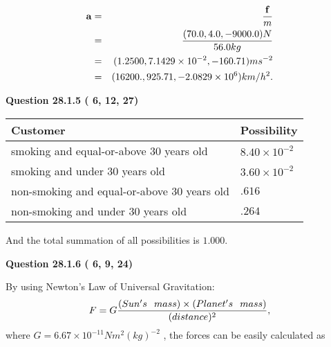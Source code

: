 \documentclass[12pt]{article}
\begin{document}
\begin{eqnarray*}
\mathbf{a}&=&\frac{\mathbf{f}}m  \\
&=&\frac{(
70.0 ,
4.0 ,
-9000.0 )N
}{ %
56.0 kg}  \\
&=&(
1.2500 ,
7.1429 \times 10^{-2},
-160.71
)ms^{-2} \\
&=&(
16200. ,
925.71 ,
-2.0829 \times 10^{6}
)km/h^2.
\end{eqnarray*}
 
 
 
  
\vspace{0.2in}
  
{\textbf{\Large{Question
28.1.5 
 (          6,         12,         27)
}}}
  
  
 
 
\noindent{}

 
\noindent
\begin{tabular}{|l|l|}
\hline
Customer & Possibility \\
\hline
smoking  and  %
equal-or-above 30 years old &
  $ %
8.40 \times 10^{-2}$ \\
\hline
smoking  and  %
under 30 years old &
  $ %
3.60 \times 10^{-2}$ \\
\hline
 non-smoking and  %
equal-or-above 30 years old &
  $ %
.616$ \\
\hline
 non-smoking and  %
under 30 years old &
  $ %
.264$ \\
\hline
\end{tabular}
 
\noindent
 And the total summation of all possibilities is $  %
1.000 $.
 
 
 
  
\vspace{0.2in}
  
{\textbf{\Large{Question
28.1.6 
 (          6,          9,         24)
}}}
  
  
 
 
\noindent{}

By using Newton's Law of Universal Gravitation:
\[
F=G \frac{(Sun's \hspace{0.1in} mass) \times (Planet's \hspace{0.1in} mass)} { (distance)^2},
\]
where
$ G= %
6.67 \times 10^{-11} N m^{2}(kg)^{-2}$ , the forces can be easily calculated as
 
\vspace{0.2in}
 
\end{document}

